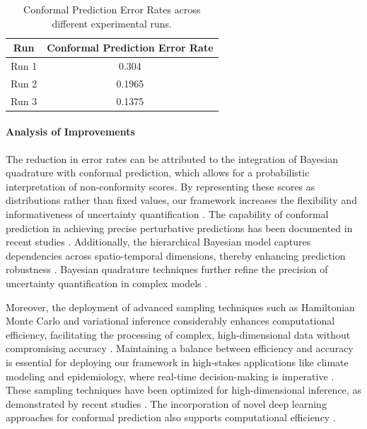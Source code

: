 \documentclass{article} %
\begin{document}
\begin{table}[h]
 \centering
 \begin{tabular}{cc}
 \hline
 \textbf{Run} & \textbf{Conformal Prediction Error Rate} \\
 \hline
 Run 1 & 0.304 \\
 Run 2 & 0.1965 \\
 Run 3 & 0.1375 \\
 \hline
 \end{tabular}
 \caption{Conformal Prediction Error Rates across different experimental runs.}
 \label{tab:results}
\end{table}

\paragraph{Analysis of Improvements} 
The reduction in error rates can be attributed to the integration of Bayesian quadrature with conformal prediction, which allows for a probabilistic interpretation of non-conformity scores. By representing these scores as distributions rather than fixed values, our framework increases the flexibility and informativeness of uncertainty quantification \citep{nonintrusive2022,precise2022,carboncp2024}. The capability of conformal prediction in achieving precise perturbative predictions has been documented in recent studies \citep{how2022,precise2022}. Additionally, the hierarchical Bayesian model captures dependencies across spatio-temporal dimensions, thereby enhancing prediction robustness \citep{predictions2022,probabilistic2018,surrogate2024}. Bayesian quadrature techniques further refine the precision of uncertainty quantification in complex models \citep{bayesian2022,new2014,error2025}.

Moreover, the deployment of advanced sampling techniques such as Hamiltonian Monte Carlo and variational inference considerably enhances computational efficiency, facilitating the processing of complex, high-dimensional data without compromising accuracy \citep{stochastic2018,thermostatassisted2017}. Maintaining a balance between efficiency and accuracy is essential for deploying our framework in high-stakes applications like climate modeling and epidemiology, where real-time decision-making is imperative \citep{spatiotemporal2024,robust2016,detecting2024}. These sampling techniques have been optimized for high-dimensional inference, as demonstrated by recent studies \citep{accelerating2025}. The incorporation of novel deep learning approaches for conformal prediction also supports computational efficiency \citep{a2022,cadapter2024}.
\end{document}
